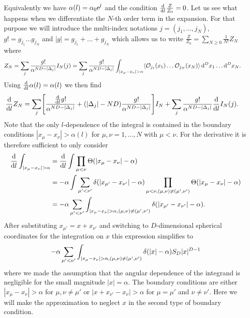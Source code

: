 \documentclass[english, parskip=full]{scrartcl}
\begin{document}
Equivalently we have $\alpha(l)=\alpha_0\text{e}^{l}$ and the condition $\frac{\text{d}}{\text{d} l} \frac{Z}{Z_0} = 0$.
Let us see what happens when we differentiate the $N$-th order term in the expansion.
For that purpose we will introduce the multi-index notations $j = (j_1,\dots,j_N)$, $g!=g_{j_1} \dots g_{j_N}$ and $|g|=g_{j_1} + \dots + g_{j_N}$ which allows us to write $\frac{Z}{Z_0} = \sum_{N\ge 0} \frac{1}{N!} Z_N$ where
\begin{align}
Z_N &= \sum_j \frac{g!}{\alpha^{ND - |\Delta_j|}} I_N(j) = \sum_j \frac{g!}{\alpha^{ND - |\Delta_j|}} \int_{|x_\mu - x_\nu|>\alpha} \bra*{\mathcal{O}_{j_1}(x_1) \dots \mathcal{O}_{j_N}(x_N)}\,\d^Dx_1 \dots \d^Dx_N.
\end{align}
Using $\frac{\text{d}}{\text{d} l} \alpha(l) = \alpha(l)$ we then find
\begin{align}
\frac{\d}{\d l}Z_N &= \sum_{j} \klb*{ \frac{\frac{\d}{\d l} g!}{\alpha^{ND- |\Delta_{j}|}} + \kla*{|\Delta_j| - ND} \frac{g!}{\alpha^{ND - |\Delta_j|}} }I_N + \sum_j \frac{g!}{\alpha^{ND-|\Delta_j|}} \frac{\d }{\d l} I_N(j).
\end{align}
Note that the only $l$-dependence of the integral is contained in the boundary conditions $|x_\mu-x_\nu|>\alpha(l)$ for $\mu,\nu = 1,\dots,N$ with $\mu<\nu$.
For the derivative it is therefore sufficient to only consider
\begin{align}
\frac{\d}{\d l}\int_{|x_\mu - x_\nu|>\alpha} &= \frac{\d}{\d l} \int \prod_{\mu<\nu} \Theta\kla*{|x_\mu-x_\nu|-\alpha} \\
&= -\alpha \int \sum_{\mu'<\nu'} \delta\kla*{|x_{\mu'}-x_{\nu'}| - \alpha} \prod_{ \mu<\nu , (\mu,\nu)\neq (\mu',\nu')} \Theta\kla*{|x_\mu-x_\nu|-\alpha}\\
&= -\alpha \sum_{\mu'<\nu'} \int_{|x_\mu - x_\nu|>\alpha,(\mu,\nu)\neq (\mu',\nu')} \delta\kla*{|x_{\mu'}-x_{\nu'}| - \alpha}.
\end{align}
After substituting $x_{\mu'}=x+x_{\nu'}$ and switching to $D$-dimensional spherical coordinates for the integration on $x$ this expression simplifies to
\begin{align}
-\alpha \sum_{\mu'<\nu'} \int_{|x_\mu - x_\nu|>\alpha,(\mu,\nu)\neq (\mu',\nu')} \delta\kla*{|x| - \alpha} S_D|x|^{D-1}
\end{align}
where we made the assumption that the angular dependence of the integrand is negligible for the small magnitude $|x|=\alpha$.
The boundary conditions are either $|x_\mu-x_\nu|>\alpha$ for $\mu,\nu \neq \mu'$ or $|x+x_{\nu'}-x_\nu|>\alpha$ for $\mu=\mu'$ and $\nu\neq \nu'$.
Here we will make the approximation to neglect $x$ in the second type of boundary condition.
\end{document}
